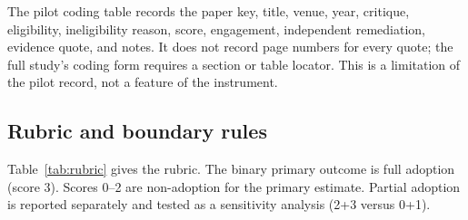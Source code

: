 \documentclass[11pt,a4paper]{article}
\begin{document}
The pilot coding table records the paper key, title, venue, year, critique, eligibility, ineligibility reason, score, engagement, independent remediation, evidence quote, and notes. It does not record page numbers for every quote; the full study's coding form requires a section or table locator. This is a limitation of the pilot record, not a feature of the instrument.

\subsection{Rubric and boundary rules}

Table~\ref{tab:rubric} gives the rubric. The binary primary outcome is full adoption (score 3). Scores 0--2 are non-adoption for the primary estimate. Partial adoption is reported separately and tested as a sensitivity analysis (2+3 versus 0+1).
\end{document}
